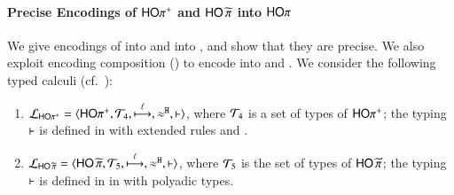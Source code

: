 \documentclass[runningheads]{llncs}
\begin{document}
{%
\paragraph{Precise Encodings of $\mathsf{HO\pi^{+}}$ and $\mathsf{HO}\,{\widetilde{\pi}}$ into $\mathsf{HO}\pi$}
\noi We give  %
encodings of \HOpp into \HOp
and into \PHOp, and show that they are precise. 
We also exploit encoding composition () to encode
\PHOpp into \HO and \sessp.
We consider the following 
typed calculi (cf.~):
\begin{enumerate}[-]
\item $\mathcal{L}_{\mathsf{HO\pi^{+}}}=\langle \mathsf{HO\pi^{+}}, {\cal{T}}_4, \stackrel{\ell}{\longmapsto}, \approx^\mathtt{H}, \vdash \rangle$,
where 
	${\cal{T}}_4$ is a set of types of $\mathsf{HO\pi^{+}}$;  
the typing $\vdash$ is defined in 
with extended rules  and .

\item 
	$\mathcal{L}_{\mathsf{HO}\,{\widetilde{\pi}}}=\langle \mathsf{HO}\,{\widetilde{\pi}}, {\cal{T}}_5, \stackrel{\ell}{\longmapsto}, \approx^\mathtt{H}, \vdash \rangle$,
where 
	${\cal{T}}_5$ is the set of types of $\mathsf{HO}\,{\widetilde{\pi}}$;  
the typing $\vdash$ is defined in
in 
with polyadic types.
\end{enumerate}

%

}
\end{document}
